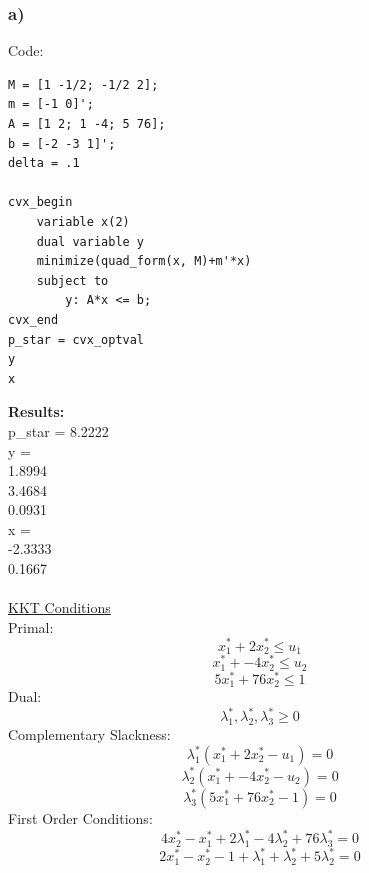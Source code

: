 \documentclass[12pt]{article}
\begin{document}
\subsubsection*{a)}
Code:
\begin{lstlisting}
M = [1 -1/2; -1/2 2];
m = [-1 0]';
A = [1 2; 1 -4; 5 76];
b = [-2 -3 1]';
delta = .1

cvx_begin
    variable x(2)
    dual variable y
    minimize(quad_form(x, M)+m'*x)
    subject to
        y: A*x <= b;
cvx_end
p_star = cvx_optval
y
x
\end{lstlisting}
\textbf{Results:}\\
p\_star = 8.2222\\
y = \\1.8994\\
    3.4684\\
    0.0931\\
x =\\-2.3333\\
    0.1667\\\\
\underline{KKT Conditions}\\
Primal:\\
$$x_1^* + 2x_2^* \le u_1$$
$$x_1^* + -4x_2^* \le u_2$$
$$5x_1^* + 76x_2^*\le 1$$
Dual:\\
$$\lambda_1^*, \lambda_2^*, \lambda_3^* \ge 0$$
Complementary Slackness:
$$\lambda_1^*(x_1^* + 2x_2^* - u_1)=0$$
$$\lambda_2^*(x_1^* + -4x_2^* - u_2)=0$$
$$\lambda_3^*(5x_1^* + 76x_2^* - 1)=0$$
First Order Conditions:
$$4x_2^*-x_1^*+2\lambda_1^*-4\lambda_2^*+76\lambda_3^*=0$$
$$2x_1^* -x_2^*-1+\lambda_1^*+\lambda_2^*+5\lambda_2^*=0$$
\end{document}
